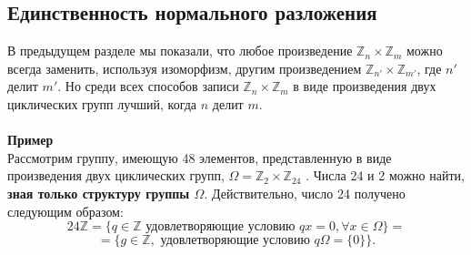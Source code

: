 \subsection{Единственность нормального разложения}
\noindent В предыдущем разделе мы показали, что любое произведение $\mathbb{Z}_n \times \mathbb{Z}_m$ \linebreak можно всегда заменить, используя изоморфизм, другим произведением \linebreak $\mathbb{Z}_{n'} \times \mathbb{Z}_{m'}$, где $n'$ делит $m'$. Но среди всех способов записи $\mathbb{Z}_n \times \mathbb{Z}_m$ в \linebreak виде произведения двух циклических групп лучший, когда $n$ делит $m$. 
\\
\\
\textbf{Пример}
\\

Рассмотрим группу, имеющую 48 элементов, представленную в виде \linebreak произведения двух циклических групп, $\Omega = \mathbb{Z}_{2} \times \mathbb{Z}_{24}$ . Числа 24 и 2 можно \linebreak найти, \textbf{зная только структуру группы $\Omega$}. Действительно, число 24 \linebreak получено следующим образом:   
 $$24\mathbb{Z} = \{ q \in \mathbb{Z} \text{ удовлетворяющие условию } qx = 0 , \forall x \in \Omega\} =$$ $$
= \{g \in \mathbb{Z},\text{ удовлетворяющие условию } q\Omega = \{0\}\}.$$


